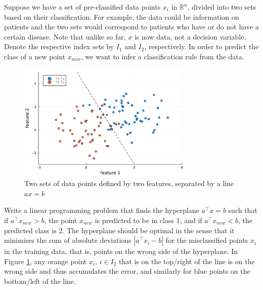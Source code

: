 Suppose we have a set of pre-classified data points $x_i$ in $\mathbb{R}^n$, divided into two sets based on their classification. For example, the data could be information on patients and the two sets would correspond to patients who have or do not have a certain disease. Note that unlike so far, $x$ is now data, not a decision variable. Denote the respective index sets by $I_1$ and $I_2$, respectively. In order to predict the class of a new point $x_{new}$, we want to infer a classification rule from the data.

\begin{figure}[H]
    \includegraphics[width=0.75\textwidth]{chapters/chapter_1/figures/figure_e16.pdf}
    \caption{Two sets of data points defined by two features, separated by a line $ax=b$} 
    \label{c1:fig:fig_e16}		
\end{figure}

Write a linear programming problem that finds the hyperplane $a^\top x = b$ such that if $a^\top x_{new} > b$, the point $x_{new}$ is predicted to be in class 1, and if $a^\top x_{new}<b$, the predicted class is 2. The hyperplane should be optimal in the sense that it minimises the sum of absolute deviations $|a^\top x_i-b|$ for the misclassified points $x_i$ in the training data, that is, points on the wrong side of the hyperplane. In Figure \ref{c1:fig:fig_e16}, any orange point $x_i$, $i \in I_2$ that is on the top/right of the line is on the wrong side and thus accumulates the error, and similarly for blue points on the bottom/left of the line.
